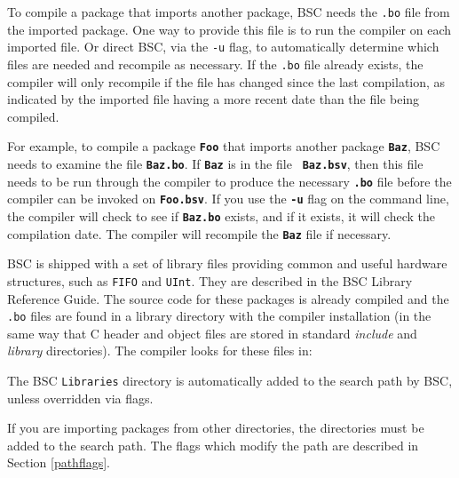\documentclass{article}
\newcommand{\te}[1]{\texttt{#1}}
\newenvironment{centerboxverbatim}
  {\center
   \boxedverbatim}
  {\endboxedverbatim
  {\endcenter }}
\begin{document}
To compile a package that imports another package,
BSC needs the \te{.bo} file from the imported
package.  One way to provide this file is to run the compiler on
each imported file. Or direct BSC, via the \te{-u} flag, to
automatically determine which files are needed and recompile as
necessary.
If the \te{.bo} file already exists, the compiler will
only recompile if the file has changed since the last compilation, as indicated
by the imported file having a more recent date than the file being compiled.

For example, to compile  a package {\bf\tt Foo} that imports another package
{\bf\tt Baz}, BSC needs to examine the file {\bf\tt Baz.bo}. If {\bf\tt Baz} is in the file {\bf\tt
Baz.bsv},  then this file needs to be run
through the compiler to produce the necessary  {\bf\tt .bo}
file before the compiler can be invoked on {\bf\tt Foo.bsv}.
If you  use the {\bf\tt -u} flag on the command line,
the compiler will check to see if {\bf\tt Baz.bo} exists,
and if it exists, it will check the compilation date.
The compiler will recompile the {\bf\tt Baz} file if necessary.

BSC is shipped with a set of library files providing common
and useful hardware structures, such as
\te{FIFO} and \te{UInt}.  They are  described in the BSC Library
Reference Guide.   The source code for these packages is already
compiled and the  \te{.bo} files are
found in a library directory with the compiler installation (in
the same way that C header and object files are stored in standard
\emph{include} and \emph{library} directories). The compiler looks for
these files in:

\begin{centerboxverbatim}
\end{centerboxverbatim}
The BSC \te{Libraries} directory is automatically
added to the search path by BSC, unless overridden via flags.

If you are importing packages from other directories, the
directories must be added to the search path.  The flags
which modify the path are described in Section \ref{pathflags}.

\end{document}
